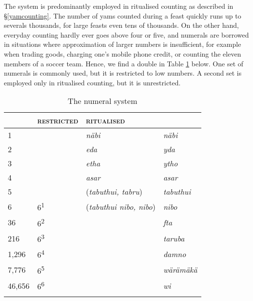 The  system is predominantly employed in ritualised counting as described in \S{}\ref{yamcounting}. The number of yams counted during a feast quickly runs up to severals thousands, for large feasts even tens of thousands. On the other hand, everyday counting hardly ever goes above four or five, and  numerals are borrowed in situations where approximation of larger numbers is insufficient, for example when trading goods, charging one's mobile phone credit, or counting the eleven members of a soccer team. Hence, we find a double  in Table \ref{numerals-table} below. One set of numerals is commonly used, but it is restricted to low numbers. A second set is employed only in ritualised counting, but it is unrestricted.

\begin{table}
\caption{The numeral system}
\label{numerals-table}
	\begin{tabular}{llll}
		\lsptoprule
		\multicolumn{2}{l}{\textsc{value}}&\textsc{restricted}&\textsc{ritualised}\\\midrule
		1&&\emph{näbi}&\emph{näbi}\\
		2&&\emph{eda}&\emph{yda}\\
		3&&\emph{etha}&\emph{ytho}\\
		4&&\emph{asar}&\emph{asar}\\
		5&&(\emph{tabuthui, tabru})&\emph{tabuthui}\\
		6&6\textsuperscript{1}&(\emph{tabuthui nibo, nibo})\footnotemark&\emph{nibo}\\
		36&6\textsuperscript{2}&&\emph{fta}\\
		216&6\textsuperscript{3}&&\emph{taruba}\\
		1,296&6\textsuperscript{4}&&\emph{damno}\\
		7,776&6\textsuperscript{5}&&\emph{wärämäkä}\\
		46,656&6\textsuperscript{6}&&\emph{wi}\\
		\lspbottomrule
	\end{tabular}
\end{table}%

